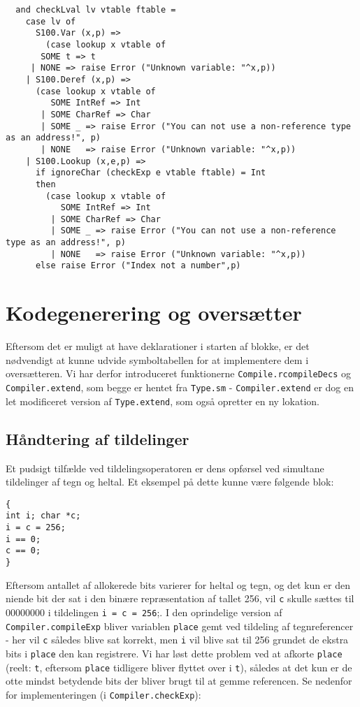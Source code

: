 \documentclass[10pt,a4paper,danish]{article}
\begin{document}
\begin{verbatim}
  and checkLval lv vtable ftable =
    case lv of
      S100.Var (x,p) =>
        (case lookup x vtable of
	   SOME t => t
	 | NONE => raise Error ("Unknown variable: "^x,p))
    | S100.Deref (x,p) =>
      (case lookup x vtable of
         SOME IntRef => Int
       | SOME CharRef => Char
       | SOME _ => raise Error ("You can not use a non-reference type as an address!", p)
       | NONE   => raise Error ("Unknown variable: "^x,p))
    | S100.Lookup (x,e,p) =>
      if ignoreChar (checkExp e vtable ftable) = Int
      then
        (case lookup x vtable of
           SOME IntRef => Int
         | SOME CharRef => Char
         | SOME _ => raise Error ("You can not use a non-reference type as an address!", p)
         | NONE   => raise Error ("Unknown variable: "^x,p))
      else raise Error ("Index not a number",p)

\end{verbatim} 

\section{Kodegenerering og oversætter}
Eftersom det er muligt at have deklarationer i starten af blokke, er det 
nødvendigt at kunne udvide symboltabellen for at implementere dem i 
oversætteren. Vi har derfor introduceret funktionerne
 \texttt{Compile.rcompileDecs}
 og \texttt{Compiler.extend}, som begge er hentet fra \texttt{Type.sm} - 
\texttt{Compiler.extend} er dog 
en let modificeret version af \texttt{Type.extend}, som også
opretter en ny lokation.  


\subsection{Håndtering af tildelinger}
Et pudsigt tilfælde ved tildelingsoperatoren er dens opførsel ved 
simultane tildelinger af tegn og heltal. Et eksempel på dette kunne
være følgende blok: 

\begin{verbatim}
{
int i; char *c;
i = c = 256;
i == 0;
c == 0;
}
\end{verbatim}

Eftersom antallet af allokerede bits varierer for heltal og tegn, 
og det kun er den niende bit der sat i den binære repræsentation
af tallet 256, vil \texttt{c} skulle sættes til 00000000 i tildelingen
\texttt{i = c = 256};. I den oprindelige version af 
\texttt{Compiler.compileExp} bliver variablen \texttt{place}
 gemt ved tildeling af tegnreferencer - 
her vil \texttt{c} således blive sat korrekt, men \texttt{i}
 vil blive sat til 
256 grundet de ekstra bits i \texttt{place} den kan registrere.
Vi har løst dette problem ved at afkorte \texttt{place} (reelt: 
\texttt{t}, eftersom \texttt{place}
tidligere bliver flyttet over i \texttt{t}), således at det kun er
 de otte mindst betydende
bits der bliver brugt til at gemme referencen. Se nedenfor for
 implementeringen
(i \texttt{Compiler.checkExp}):
\end{document}
